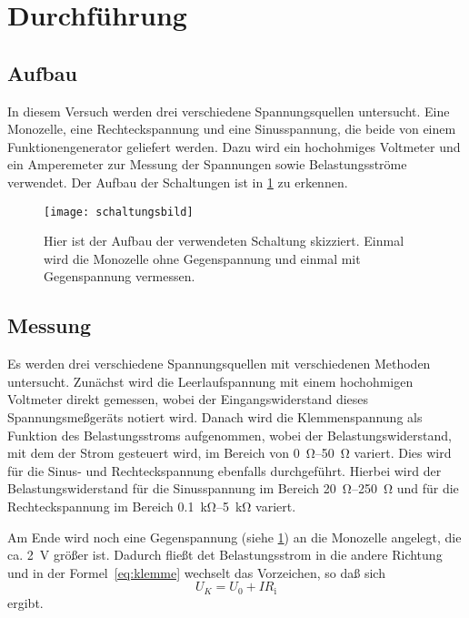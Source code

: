 
\section{Durchführung}

\subsection{Aufbau}

In diesem Versuch werden drei verschiedene Spannungsquellen untersucht.
Eine Monozelle, eine Rechteckspannung und eine Sinusspannung, die beide
von einem Funktionengenerator geliefert werden.  Dazu wird ein
hochohmiges Voltmeter und ein Amperemeter zur Messung der Spannungen
sowie Belastungsströme verwendet.  Der Aufbau der Schaltungen ist in
\cref{fig:schaltungsbild} zu erkennen.

\begin{figure}
  \centering
  \texttt{[image: schaltungsbild]}
  \caption{Hier ist der Aufbau der verwendeten Schaltung skizziert.
    Einmal wird die Monozelle ohne Gegenspannung und einmal mit
    Gegenspannung vermessen. \cite{v301}}
  \label{fig:schaltungsbild}
\end{figure}

\subsection{Messung}

Es werden drei verschiedene Spannungsquellen mit verschiedenen Methoden
untersucht.  Zunächst wird die Leerlaufspannung mit einem hochohmigen
Voltmeter direkt gemessen, wobei der Eingangswiderstand dieses
Spannungsmeßgeräts notiert wird.  Danach wird die Klemmenspannung als
Funktion des Belastungsstroms aufgenommen, wobei der
Belastungswiderstand, mit dem der Strom gesteuert wird, im Bereich von
\SIrange{0}{50}{\ohm} variert.  Dies wird für die Sinus- und
Rechteckspannung ebenfalls durchgeführt.  Hierbei wird der
Belastungswiderstand für die Sinusspannung im Bereich
\SIrange{20}{250}{\ohm} und für die Rechteckspannung im Bereich
\SIrange{0.1}{5}{\kilo\ohm} variert.

Am Ende wird noch eine Gegenspannung (siehe \cref{fig:schaltungsbild})
an die Monozelle angelegt, die ca. \SI{2}{\volt} größer ist. Dadurch
fließt det Belastungsstrom in die andere Richtung und in der
Formel~\eqref{eq:klemme} wechselt das Vorzeichen, so daß sich
\begin{equation}
  \label{eq:klemme-gegenspannung}
  U_K = U_0 + I R_\text{i}
\end{equation}
ergibt.
